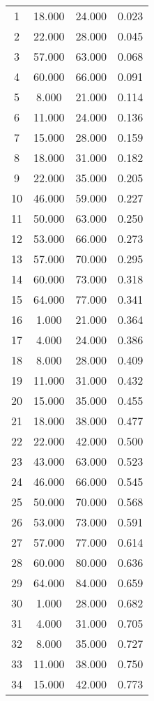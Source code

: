 % 
\begin{tabular}{cccc}
  \hline
  \hline
1 & 18.000 & 24.000 & 0.023 \\ 
  2 & 22.000 & 28.000 & 0.045 \\ 
  3 & 57.000 & 63.000 & 0.068 \\ 
  4 & 60.000 & 66.000 & 0.091 \\ 
  5 & 8.000 & 21.000 & 0.114 \\ 
  6 & 11.000 & 24.000 & 0.136 \\ 
  7 & 15.000 & 28.000 & 0.159 \\ 
  8 & 18.000 & 31.000 & 0.182 \\ 
  9 & 22.000 & 35.000 & 0.205 \\ 
  10 & 46.000 & 59.000 & 0.227 \\ 
  11 & 50.000 & 63.000 & 0.250 \\ 
  12 & 53.000 & 66.000 & 0.273 \\ 
  13 & 57.000 & 70.000 & 0.295 \\ 
  14 & 60.000 & 73.000 & 0.318 \\ 
  15 & 64.000 & 77.000 & 0.341 \\ 
  16 & 1.000 & 21.000 & 0.364 \\ 
  17 & 4.000 & 24.000 & 0.386 \\ 
  18 & 8.000 & 28.000 & 0.409 \\ 
  19 & 11.000 & 31.000 & 0.432 \\ 
  20 & 15.000 & 35.000 & 0.455 \\ 
  21 & 18.000 & 38.000 & 0.477 \\ 
  22 & 22.000 & 42.000 & 0.500 \\ 
  23 & 43.000 & 63.000 & 0.523 \\ 
  24 & 46.000 & 66.000 & 0.545 \\ 
  25 & 50.000 & 70.000 & 0.568 \\ 
  26 & 53.000 & 73.000 & 0.591 \\ 
  27 & 57.000 & 77.000 & 0.614 \\ 
  28 & 60.000 & 80.000 & 0.636 \\ 
  29 & 64.000 & 84.000 & 0.659 \\ 
  30 & 1.000 & 28.000 & 0.682 \\ 
  31 & 4.000 & 31.000 & 0.705 \\ 
  32 & 8.000 & 35.000 & 0.727 \\ 
  33 & 11.000 & 38.000 & 0.750 \\ 
  34 & 15.000 & 42.000 & 0.773 \\ 

\end{tabular}
